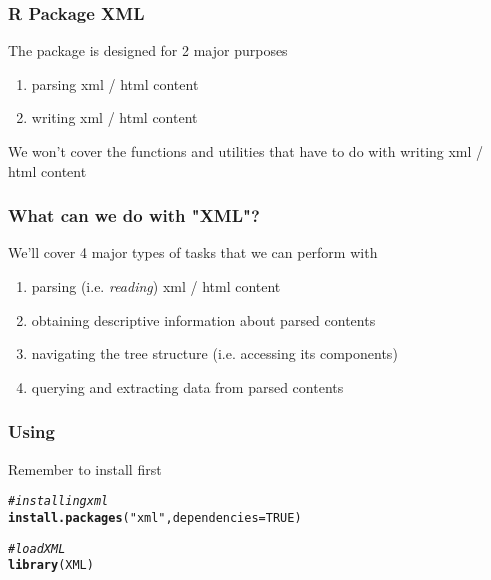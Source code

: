 \documentclass[12pt]{beamer}\usepackage[]{graphicx}\usepackage[]{color}
\makeatletter
\newcommand{\hlnum}[1]{\textcolor[rgb]{0.686,0.059,0.569}{#1}}%
\newcommand{\hlstr}[1]{\textcolor[rgb]{0.192,0.494,0.8}{#1}}%
\newcommand{\hlcom}[1]{\textcolor[rgb]{0.678,0.584,0.686}{\textit{#1}}}%
\newcommand{\hlstd}[1]{\textcolor[rgb]{0.345,0.345,0.345}{#1}}%
\newcommand{\hlkwc}[1]{\textcolor[rgb]{0.333,0.667,0.333}{#1}}%
\newcommand{\hlkwd}[1]{\textcolor[rgb]{0.737,0.353,0.396}{\textbf{#1}}}%
\newenvironment{kframe}{%
 \def\at@end@of@kframe{}%
 \ifinner\ifhmode%
  \def\at@end@of@kframe{\end{minipage}}%
  \begin{minipage}{\columnwidth}%
 \fi\fi%
 \def\FrameCommand##1{\hskip\@totalleftmargin \hskip-\fboxsep
 \colorbox{shadecolor}{##1}\hskip-\fboxsep
     \hskip-\linewidth \hskip-\@totalleftmargin \hskip\columnwidth}%
 \MakeFramed {\advance\hsize-\width
   \@totalleftmargin\z@ \linewidth\hsize
   \@setminipage}}%
 {\par\unskip\endMakeFramed%
 \at@end@of@kframe}
\newenvironment{knitrout}{}{} %
\makeatother
\begin{document}

\begin{frame}
\begin{center}
\Huge{}
\end{center}
\end{frame}


\begin{frame}
\frametitle{R Package XML}

The package  is designed for 2 major purposes
\begin{enumerate}
 \item parsing xml / html content
 \item writing xml / html content
\end{enumerate}

\bigskip

We won't cover the functions and utilities that have to do with writing xml / html content

\end{frame}


\begin{frame}
\frametitle{What can we do with "XML"?}

We'll cover 4 major types of tasks that we can perform with 
\begin{enumerate}
 \item parsing (i.e. \textit{reading}) xml / html content
 \item obtaining descriptive information about parsed contents
 \item navigating the tree structure (i.e. accessing its components)
 \item querying and extracting data from parsed contents
\end{enumerate}

\end{frame}


\begin{frame}[fragile]
\frametitle{Using }

Remember to install  first
\begin{knitrout}\footnotesize
{}\color{fgcolor}\begin{kframe}
\begin{alltt}
\hlcom{# installing xml}
\hlkwd{install.packages}\hlstd{(}\hlstr{"xml"}\hlstd{,} \hlkwc{dependencies} \hlstd{=} \hlnum{TRUE}\hlstd{)}

\hlcom{# load XML}
\hlkwd{library}\hlstd{(XML)}
\end{alltt}
\end{kframe}
\end{knitrout}



\end{frame}
\end{document}
